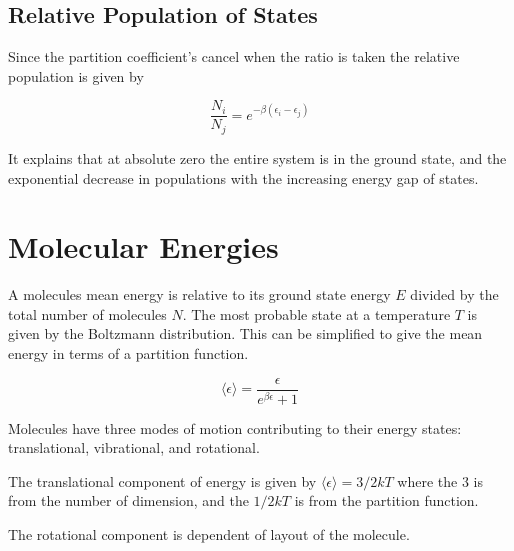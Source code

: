 \documentclass[a4paper, 12 pt]{article}
\begin{document}
\begin{flushleft}
\subsection{Relative Population of States}

Since the partition coefficient's cancel when the ratio is taken the relative population is given by

\begin{equation*}
    \frac{N_i}{N_j} = e^{-\beta(\epsilon_i - \epsilon_j)}
\end{equation*}

It explains that at absolute zero the entire system is in the ground state, and the exponential decrease in populations with the increasing energy gap of states.

\section{Molecular Energies}

A molecules mean energy is relative to its ground state energy $E$ divided by the total number of molecules $N$. The most probable state at a temperature $T$ is given by the Boltzmann distribution. This can be simplified to give the mean energy in terms of a partition function.

\begin{equation*}
    \langle \epsilon \rangle = \frac{\epsilon}{e^{\beta \epsilon} + 1}
\end{equation*}

Molecules have three modes of motion contributing to their energy states: translational, vibrational, and rotational.

The translational component of energy is given by $\langle \epsilon \rangle = 3/2 kT$ where the $3$ is from the number of dimension, and the $1/2 kT$ is from the partition function. 

The rotational component is dependent of layout of the molecule. 
\end{flushleft}
\end{document}
